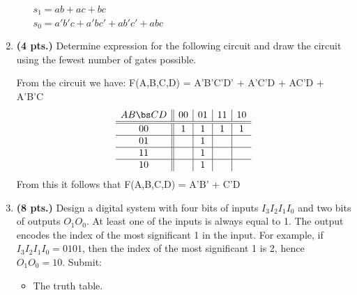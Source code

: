 \begin{enumerate}
\begin{enumerate}
\begin{solution}{
$s_1 = ab + ac + bc $ \\
$s_0 = a'b'c + a'bc' + ab'c' + abc $
} \end{solution}
\end{enumerate}

\item  {\bf (4 pts.)} Determine \SOPmin expression for the following circuit
and draw the circuit using the fewest number of gates possible.
\begin{figure}[ht]
\label{fig:Hw3}
\end{figure}

\begin{solution}{
From the circuit we have:
F(A,B,C,D) = A'B'C'D' + A'C'D + AC'D + A'B'C
$$ \begin{array} {c||c|c|c|c}
       AB \bs CD & 00 & 01 & 11 & 10 \\ \hline \hline
       00        & 1  & 1  & 1  & 1  \\ \hline
       01        &    & 1  &    &    \\ \hline
       11        &    & 1  &    &    \\ \hline
       10        &    & 1  &    &    \\
\end{array} $$ 
From this it follows that 
F(A,B,C,D) =  A'B' + C'D
} \end{solution}

\item  {\bf (8 pts.)} Design a digital system with four bits of inputs 
$I_3 I_2 I_1 I_0$ and two bits of outputs $O_1 O_0$.  At least one
of the inputs is always equal to 1.  The output encodes the 
index of the most significant 1 in the input.
For example, if $I_3 I_2 I_1 I_0 = 0101$, then the index
of the most significant 1 is 2, hence $O_1 O_0 = 10$.  Submit:
\begin{itemize}
\item The truth table.


\end{itemize}
\end{enumerate}
